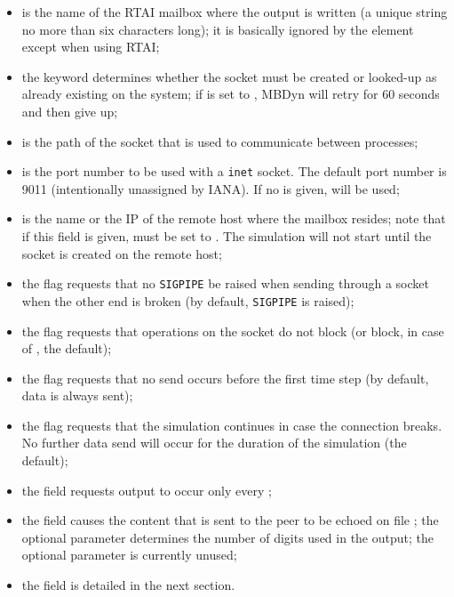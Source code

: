 \begin{itemize}
\item {} is the name of the RTAI mailbox where 
the output is written  (a unique string no more than six characters long);
it is basically ignored by the  element
except when using RTAI;

\item the  keyword determines whether the socket
must be created or looked-up as already existing on the system;
if  is set to , MBDyn will retry for 60 seconds
and then give up;

\item {} is the path of the  socket 
that is used to communicate between processes;

\item {} is the port number to be used with a \texttt{inet} socket.
The default port number is 9011 (intentionally unassigned by IANA).
If no  is given,  will be used;

\item {} is the name or the IP of the remote host where
the mailbox resides; note that if this field is given,  must
be set to .
The simulation will not start until the socket is created on the remote host;

\item the flag  requests that no \texttt{SIGPIPE} be raised
when sending through a socket when the other end is broken
(by default, \texttt{SIGPIPE} is raised);

\item the flag  requests that operations on the socket
do not block (or block, in case of , the default);

\item the flag  requests that no send occurs before
the first time step (by default, data is always sent);

\item the flag  requests that the simulation
continues in case the connection breaks.
No further data send will occur for the duration of the simulation
(the default);

\item the field  requests output to occur
only every ;

\item the field  causes the content that is sent to the peer
to be echoed on file ; the optional parameter 
determines the number of digits used in the output; the optional parameter
 is currently unused;

\item the field  is detailed in the next section.
\end{itemize}
